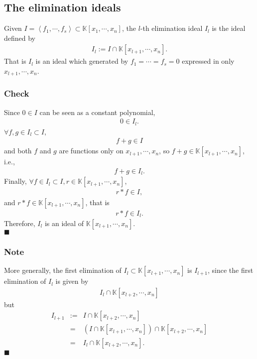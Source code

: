 \documentclass[11pt]{book}
\begin{document}
\subsection{The elimination ideals}
Given $I = \left< f_1, \cdots, f_s \right> \subset \mathbb{K}[x_1, \cdots, x_n]$, the $l$-th elimination ideal $I_l$ is the ideal defined by
\begin{eqnarray}
I_l := I \cap \mathbb{K}[x_{l+1}, \cdots, x_n].
\end{eqnarray}
That is $I_l$ is an ideal which generated by $f_1 = \cdots = f_s=0$ expressed in only $x_{l+1}, \cdots, x_n$.

\subsubsection{Check}
Since $0\in I$ can be seen as a constant polynomial,
\begin{eqnarray}
0 \in I_l.
\end{eqnarray}
$\forall f,g \in I_l \subset I$,
\begin{eqnarray}
f + g \in I
\end{eqnarray}
and both $f$ and $g$ are functions only on $x_{l+1}, \cdots, x_n$, so $f+g \in \mathbb{K}[x_{l+1}, \cdots, x_n]$, i.e.,
\begin{eqnarray}
f + g \in I_l.
\end{eqnarray}
Finally, $\forall f \in I_l \subset I, r \in \mathbb{K}[x_{l+1}, \cdots, x_n]$,
\begin{eqnarray}
r * f \in I,
\end{eqnarray}
and $r * f \in \mathbb{K}[x_{l+1}, \cdots, x_n]$, that is
\begin{eqnarray}
r * f \in I_l.
\end{eqnarray}
Therefore, $I_l$ is an ideal of $ \mathbb{K}[x_{l+1}, \cdots, x_n]$.\\
$\blacksquare$

\subsubsection{Note}
More generally, the first elimination of $I_l \subset \mathbb{K}[x_{l+1}, \cdots, x_n]$ is $I_{l+1}$, since the first elimination of $I_l$ is given by
\begin{eqnarray}
I_l \cap \mathbb{K}[x_{l+2}, \cdots, x_n]
\end{eqnarray}
but
\begin{eqnarray}
I_{l+1} &:=& I \cap \mathbb{K}[x_{l+2}, \cdots, x_n] \\
&=& \left( I \cap \mathbb{K}[x_{l+1}, \cdots, x_n] \right) \cap \mathbb{K}[x_{l+2}, \cdots, x_n] \\
&=& I_l \cap \mathbb{K}[x_{l+2}, \cdots, x_n].
\end{eqnarray}
$\blacksquare$
\end{document}
